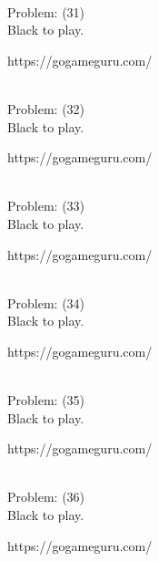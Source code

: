 \documentclass[11pt]{article}
\begin{document}
\begin{minipage}[t]{0.5\textwidth}
  {\centering
  
\\
  Problem: (31)\\
  Black to play.

https://gogameguru.com/\\
  }
\end{minipage}
\begin{minipage}[t]{0.5\textwidth}
  {\centering
  
\\
  Problem: (32)\\
  Black to play.

https://gogameguru.com/\\
  }
\end{minipage}
\begin{minipage}[t]{0.5\textwidth}
  {\centering
  
\\
  Problem: (33)\\
  Black to play.

https://gogameguru.com/\\
  }
\end{minipage}
\begin{minipage}[t]{0.5\textwidth}
  {\centering
  
\\
  Problem: (34)\\
  Black to play.

https://gogameguru.com/\\
  }
\end{minipage}
\begin{minipage}[t]{0.5\textwidth}
  {\centering
  
\\
  Problem: (35)\\
  Black to play.

https://gogameguru.com/\\
  }
\end{minipage}
\begin{minipage}[t]{0.5\textwidth}
  {\centering
  
\\
  Problem: (36)\\
  Black to play.

https://gogameguru.com/\\
  }
\end{minipage}
\end{document}
